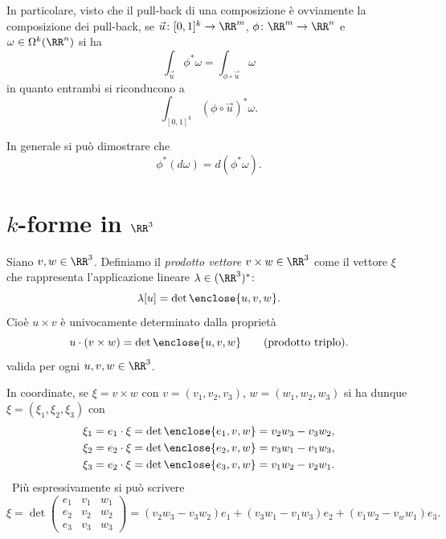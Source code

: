 In particolare, visto che il pull-back di una composizione è ovviamente 
la composizione dei pull-back, se $\vec u \colon [0,1]^k\to \RR^m$, 
$\phi\colon \RR^m\to \RR^n$ e $\omega\in \Omega^k(\RR^n)$
si ha 
\[
   \int_{\vec u} \phi^* \omega = \int_{\phi \circ \vec u} \omega 
\]
in quanto entrambi si riconducono a
\[
  \int_{[0,1]^k} (\phi \circ \vec u)^* \omega.
\]

In generale si può dimostrare che 
\[
    \phi^* (d\omega) = d(\phi^* \omega).
\]

\section{$k$-forme in $\RR^3$}

\begin{definition}
Siano $v,w\in \RR^3$.
Definiamo il \emph{prodotto vettore} $v\times w\in \RR^3$ 
come il vettore $\xi$ che rappresenta l'applicazione lineare $\lambda\in (\RR^3)^*$:
\[
 \lambda[u] = \det\enclose{u,v,w}.
\]
Cioè $u\times v$ è univocamente determinato dalla proprietà 
\[
  u \cdot (v\times w) = \det\enclose{u, v, w} \qquad\text{(prodotto triplo)}.
\]
valida per ogni $u,v,w\in \RR^3$.
\end{definition}

In coordinate, se $\xi = v\times w$ con $v=(v_1,v_2,v_3)$, $w=(w_1,w_2,w_3)$
si ha dunque $\xi=(\xi_1,\xi_2,\xi_3)$ 
con
\begin{align*}
  \xi_1 &= e_1 \cdot \xi = \det\enclose{e_1,v,w} = v_2 w_3 - v_3 w_2,\\ 
  \xi_2 &= e_2 \cdot \xi = \det\enclose{e_2,v,w} = v_3 w_1 - v_1 w_3,\\
  \xi_3 &= e_2 \cdot \xi = \det\enclose{e_3,v,w} = v_1 w_2 - v_2 w_1.
\end{align*}\
Più espressivamente si può scrivere
\[
  \xi = \det\begin{pmatrix}
    e_1 & v_1 & w_1 \\ e_2 & v_2 & w_2 \\ e_3 & v_3 & w_3
  \end{pmatrix}
  = (v_2 w_3 - v_3 w_2) e_1 + (v_3 w_1 - v_1 w_3) e_2 + (v_1 w_2 - v_w w_1) e_3. 
\]

